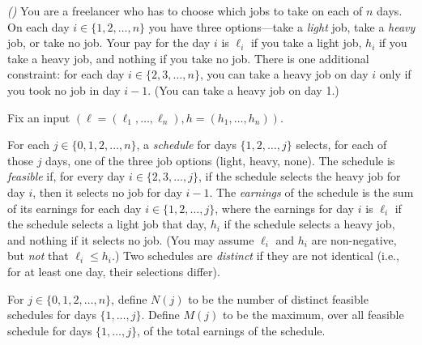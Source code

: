 \documentclass[11pt]{article}
\begin{document}
\gradescopeInit






\newpage 

\problem\emph{()}
You are a freelancer who has to choose which jobs to take on each of $n$ days.  
On each day $i\in\{1,2,\ldots,n\}$ you have three options---take a \emph{light} job, take a \emph{heavy} job, or take no job.
Your pay for the day $i$ is $\ell_i$ if you take a light job, $h_i$ if you take a heavy job, and nothing if you take no job.
There is one additional constraint: for each day $i\in\{2, 3, \ldots, n\}$,
you can take a heavy job on day $i$ only if you took no job in day $i-1$.
(You can take a heavy job on day 1.)

\smallskip

Fix an input $(\ell=(\ell_1,\ldots,\ell_n), h=(h_1,\ldots,h_n))$.

For each $j\in\{0,1,2,\ldots,n\}$, 
a \emph{schedule} for days $\{1, 2, \ldots, j\}$
selects, for each of those $j$ days, one of the three job options (light, heavy, none).
The schedule is \emph{feasible} if, for every day $i\in\{2, 3, \ldots, j\}$,
if the schedule selects the heavy job for day $i$,
then it selects no job for day $i-1$.
The \emph{earnings} of the schedule is the sum of its earnings for each day $i\in\{1,2, \ldots, j\}$,
where the earnings for day $i$ is $\ell_i$ if the schedule selects a light job that day,
$h_i$ if the schedule selects a heavy job, and nothing if it selects no job.
(You may assume $\ell_i$ and $h_i$ are non-negative, but \emph{not} that $\ell_i \le h_i$.)
Two schedules are \emph{distinct} if they are not identical
(i.e., for at least one day, their selections differ).

For $j\in\{0,1,2,\ldots,n\}$, 
define $N(j)$ to be the number of distinct feasible schedules for days $\{1,\ldots, j\}$.
Define $M(j)$ to be the maximum, over all feasible schedule for days $\{1,\dots,j\}$,
of the total earnings of the schedule.
\end{document}
